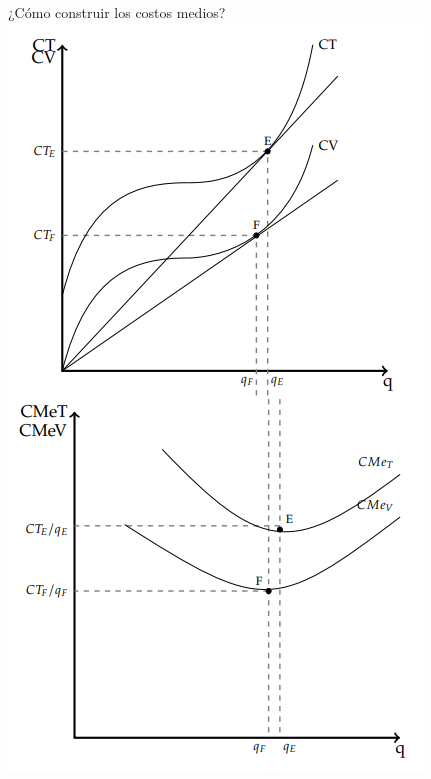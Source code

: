 \documentclass{beamer}
\begin{document}
\begin{frame}{¿Cómo construir los costos medios?}
    \centering
    \includegraphics[scale=0.5]{../Figures/C13.6.png}
\end{frame}
\end{document}
